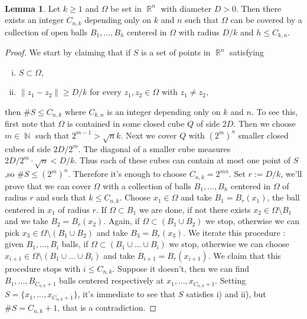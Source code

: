\documentclass[12pt]{article}
\theoremstyle{definition}
\newtheorem{lemma}{Lemma}
\DeclareMathOperator\rr{\mathbb{R}}
\DeclareMathOperator\nn{\mathbb{N}}
\begin{document}
\
\begin{lemma}\label{covering}
Let $k\ge 1$ and $\Omega$ be set in $\rr^n$ with diameter $D>0$. Then there exists an integer $C_{n,k}$ depending only on $k$ and $n$ such that $\Omega$ can be covered by a collection of open balls $B_1,...,B_h$ centered in $\Omega$ with radius $D/k$ and $h \le C_{k,n}.$
\end{lemma}
\begin{proof}
We start by claiming that if $S$ is a set of points in $\rr^n$ satisfying
\begin{enumerate}[i)]
\item  	$S \subset \Omega$,
\item $\|z_1-z_2 \|\ge D/k$ for every $z_1,z_2 \in \Omega$ with $z_1 \neq z_2$,
\end{enumerate}
then $\#S\le C_{n,k}$ where $C_{k,n}$ is an integer depending only on $k$ and $n$. To see this, first note that $\Omega$ is contained in some closed cube $Q$ of side $2D$. Then we choose $m \in \nn$ such that $2^{m-1}>\sqrt n k$. Next we cover $Q$ with $(2^m)^n$ smaller closed cubes of side $2D/2^m$. The diagonal of a smaller cube measures $2D/2^m \cdot \sqrt n < D/k$. Thus each of these cubes can contain at most one point of $S$ ,so $\#S\le (2^m)^n.$ Therefore it's enough to choose $C_{n,k}=2^{mn}.$ Set $r:=D/k$, we'll prove that we can cover $\Omega$ with a collection of balls $B_1,...,B_h$ centered in $\Omega$ of radius $r$ and such that $k\le C_{n,k}.$ Choose $x_1 \in \Omega$ and take $B_1=B_r(x_1)$, the ball centered in $x_1$ of radius $r$. If $\Omega \subset B_1$ we are done, if not there exists $x_2 \in \Omega\setminus B_1$ and we take $B_2=B_r(x_2).$ Again, if $\Omega \subset (B_1\cup B_2)$ we stop, otherwise we can pick $x_3 \in  \Omega\setminus (B_1 \cup B_2)$ and take $B_3=B_r(x_3).$ We iterate this procedure : given $B_1,...,B_i$ balls, if $ \Omega \subset (B_1\cup...\cup B_i)$ we stop, otherwise we can choose $x_{i+1} \in  \Omega \setminus (B_1\cup...\cup B_i)$ and take $B_{i+1}=B_r(x_{i+1}).$ We claim that this procedure stops with $i\le C_{n,k}.$ Suppose it doesn't, then we can find $B_1,...,B_{C_{n,k}+1}$ balls centered respectively at $x_1,...,x_{C_{n,k}+1}$. Setting $S= \{x_1,...,x_{C_{n,k}+1} \}$, it's immediate to see that $S$ satisfies i) and ii), but $\#S=C_{n,k}+1$, that is a contradiction.
\end{proof}
\end{document}
